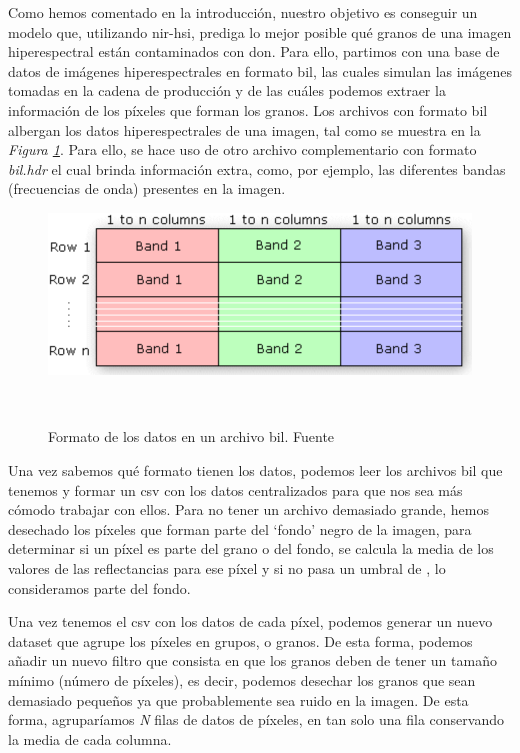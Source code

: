 Como hemos comentado en la introducción, nuestro objetivo es conseguir un modelo que, utilizando \gls{nir-hsi}, prediga lo mejor posible qué granos de una \gls{imagen hiperespectral} están contaminados con \acrshort{don}. Para ello, partimos con una base de datos de imágenes hiperespectrales en formato \acrshort{bil}, las cuales simulan las imágenes tomadas en la cadena de producción y de las cuáles podemos extraer la información de los píxeles que forman los granos.
Los archivos con formato \acrshort{bil} albergan los datos hiperespectrales de una imagen, tal como se muestra en la \textit{Figura \ref{fig:bil-example}}. Para ello, se hace uso de otro archivo complementario con formato \textit{bil.hdr} el cual brinda información extra, como, por ejemplo, las diferentes bandas (frecuencias de onda) presentes en la imagen. 

\begin{figure}[!ht]
    \centering
    \includegraphics[width=0.7\linewidth]{media/images/bil.png}
    \caption{Formato de los datos en un archivo \acrshort{bil}. Fuente \cite{Archivos82:online}}\ \label{fig:bil-example}
\end{figure}

Una vez sabemos qué formato tienen los datos, podemos leer los archivos \acrshort{bil} que tenemos y formar un \acrshort{csv} con los datos centralizados para que nos sea más cómodo trabajar con ellos. Para no tener un archivo demasiado grande, hemos desechado los píxeles que forman parte del `fondo' negro de la imagen, para determinar si un píxel es parte del grano o del fondo, se calcula la media de los valores de las reflectancias para ese píxel y si no pasa un umbral de , lo consideramos parte del fondo.

Una vez tenemos el \acrshort{csv} con los datos de cada píxel, podemos generar un nuevo \gls{dataset} que agrupe los píxeles en grupos, o granos. De esta forma, podemos añadir un nuevo filtro que consista en que los granos deben de tener un tamaño mínimo (número de píxeles), es decir, podemos desechar los granos que sean demasiado pequeños ya que probablemente sea ruido en la imagen. De esta forma, agruparíamos \textit{N} filas de datos de píxeles, en tan solo una fila conservando la media de cada columna.

